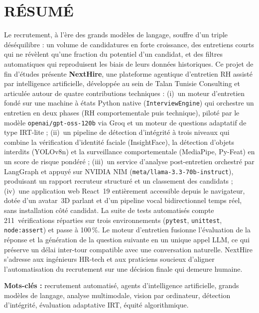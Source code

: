 \chapter*{RÉSUMÉ}
\adjustmtc%
\thispagestyle{MyStyle}

\begin{sloppypar}
Le recrutement, à l'ère des grands modèles de langage, souffre d'un triple déséquilibre :
un volume de candidatures en forte croissance, des entretiens courts qui ne révèlent qu'une
fraction du potentiel d'un candidat, et des filtres automatiques qui reproduisent les biais
de leurs données historiques. Ce projet de fin d'études présente \textbf{NextHire}, une
plateforme agentique d'entretien RH assisté par intelligence artificielle, développée au sein
de Talan Tunisie Consulting et articulée autour de quatre contributions techniques :
(i)~un moteur d'entretien fondé sur une machine à états Python native (\texttt{InterviewEngine})
qui orchestre un entretien en deux phases (RH comportementale puis technique), piloté par le
modèle \texttt{openai/\allowbreak gpt-oss-120b} via Groq et un moteur de questions adaptatif de
type IRT-lite ; (ii)~un pipeline de détection d'intégrité à trois niveaux qui combine la
vérification d'identité faciale (InsightFace), la détection d'objets interdits (YOLOv8n) et la
surveillance comportementale (MediaPipe, Py-Feat) en un score de risque pondéré ;
(iii)~un service d'analyse post-entretien orchestré par LangGraph et appuyé sur NVIDIA NIM
(\texttt{meta/\allowbreak llama-3.3-\allowbreak 70b-\allowbreak instruct}), produisant un rapport
recruteur structuré et un classement des candidats ; (iv)~une application web React~19
entièrement accessible depuis le navigateur, dotée d'un avatar~3D parlant et d'un pipeline vocal
bidirectionnel temps réel, sans installation côté candidat. La suite de tests automatisés compte
211~vérifications réparties sur trois environnements (\texttt{pytest}, \texttt{unittest},
\texttt{node:assert}) et passe à 100\,\%. Le moteur d'entretien fusionne l'évaluation de la réponse
et la génération de la question suivante en un unique appel LLM, ce qui préserve un délai inter-tour
compatible avec une conversation naturelle. NextHire s'adresse aux ingénieurs HR-tech et aux
praticiens soucieux d'aligner l'automatisation du recrutement sur une décision finale qui demeure
humaine.

\bigskip
\noindent\textbf{Mots-clés :} recrutement automatisé, agents d'intelligence artificielle,
grands modèles de langage, analyse multimodale, vision par ordinateur, détection d'intégrité,
évaluation adaptative IRT, équité algorithmique.
\end{sloppypar}

